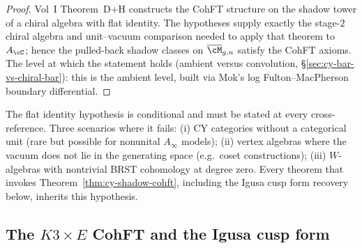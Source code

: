\begin{proof}
Vol~I Theorem~D+H constructs the CohFT structure on the shadow tower of a
chiral algebra with flat identity. The hypotheses supply exactly the
stage-$2$ chiral algebra and unit--vacuum comparison needed to apply that
theorem to $A_\cC$; hence the pulled-back shadow classes on
$\overline{\cM}_{g,n}$ satisfy the CohFT axioms. The level at which the
statement holds (ambient versus convolution,
\S\ref{sec:cy-bar-vs-chiral-bar}): this is the ambient level, built via
Mok's log Fulton--MacPherson boundary differential.
\end{proof}

\begin{remark}[conditionality]
\label{rem:cohft-flat-identity-cy}
The flat identity hypothesis is conditional and must be stated at every cross-reference. Three scenarios where it fails: (i) CY categories without a categorical unit (rare but possible for nonunital $A_\infty$ models); (ii) vertex algebras where the vacuum does not lie in the generating space (e.g.\ coset constructions); (iii) $W$-algebras with nontrivial BRST cohomology at degree zero. Every theorem that invokes Theorem~\ref{thm:cy-shadow-cohft}, including the Igusa cusp form recovery below, inherits this hypothesis.
\end{remark}

\subsection{The \texorpdfstring{$K3 \times E$}{K3 x E} CohFT and the Igusa cusp form}

